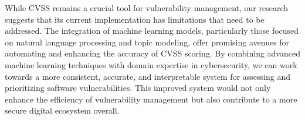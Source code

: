 While CVSS remains a crucial tool for vulnerability management, our research suggests that its current implementation has limitations that need to be addressed. The integration of machine learning models, particularly those focused on natural language processing and topic modeling, offer promising avenues for automating and enhancing the accuracy of CVSS scoring. By combining advanced machine learning techniques with domain expertise in cybersecurity, we can work towards a more consistent, accurate, and interpretable system for assessing and prioritizing software vulnerabilities. This improved system would not only enhance the efficiency of vulnerability management but also contribute to a more secure digital ecosystem overall.






